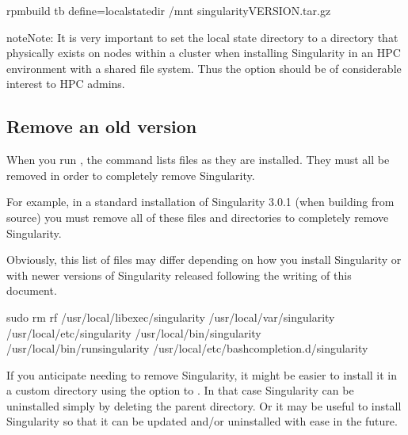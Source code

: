 \documentclass[letterpaper,10pt,english]{sphinxmanual}
\begin{document}
%
\begin{sphinxVerbatim}[commandchars=\\\{\}]
rpmbuild \PYGZhy{}tb \PYGZhy{}\PYGZhy{}define=\PYGZsq{}\PYGZus{}localstatedir /mnt\PYGZsq{} singularity\PYGZhy{}\PYGZdl{}VERSION.tar.gz\PYGZsq{}
\end{sphinxVerbatim}

\begin{sphinxadmonition}{note}{Note:}
It is very important to set the local state directory to a directory that
physically exists on nodes within a cluster when installing Singularity in
an HPC environment with a shared file system.  Thus the 
option should be of considerable interest to HPC admins.
\end{sphinxadmonition}


\subsection{Remove an old version}
\label{\detokenize{installation:remove-an-old-version}}\label{\detokenize{installation:id4}}
When you run , the command lists files as they are
installed. They must all be removed in order to completely remove Singularity.

For example, in a standard installation of Singularity 3.0.1 (when building from
source) you must remove all of these files and directories to completely remove
Singularity.

Obviously, this list of files may differ depending on how you install
Singularity or with newer versions of Singularity released following the writing
of this document.

%
\begin{sphinxVerbatim}[commandchars=\\\{\}]
\PYGZdl{} sudo rm \PYGZhy{}rf \PYGZbs{}
    /usr/local/libexec/singularity \PYGZbs{}
    /usr/local/var/singularity \PYGZbs{}
    /usr/local/etc/singularity \PYGZbs{}
    /usr/local/bin/singularity \PYGZbs{}
    /usr/local/bin/run\PYGZhy{}singularity \PYGZbs{}
    /usr/local/etc/bash\PYGZus{}completion.d/singularity
\end{sphinxVerbatim}

If you anticipate needing to remove Singularity, it might be easier to install
it in a custom directory using the  option to .  In that
case Singularity can be uninstalled simply by deleting the parent directory. Or
it may be useful to install Singularity {\hyperref[\detokenize{installation:install-rpm}]{}} so that it can be updated and/or uninstalled with ease in the
future.
\end{document}
